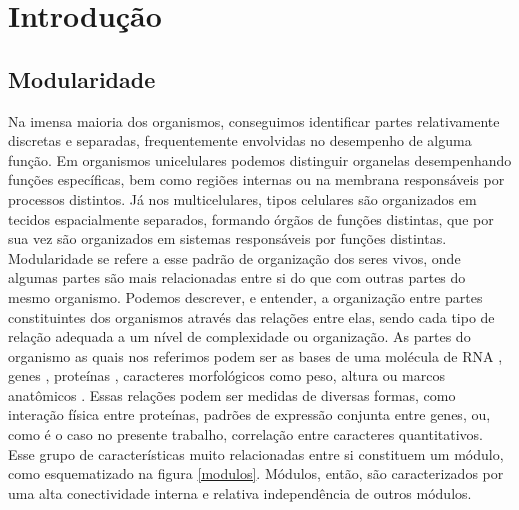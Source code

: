 \cleardoublepage
\pagestyle{fancy}

\chapter{Introdução}\label{intro}

\section{Modularidade}\label{intro:modularidade}

Na imensa maioria dos organismos, conseguimos identificar partes relativamente discretas
e separadas, frequentemente envolvidas no desempenho de alguma função.
Em organismos unicelulares podemos distinguir organelas desempenhando
funções específicas, bem como regiões internas ou na membrana responsáveis por
processos distintos.
Já nos multicelulares, tipos celulares são organizados em tecidos espacialmente
separados, formando órgãos de funções distintas, que por sua vez são
organizados em sistemas responsáveis por funções distintas.
Modularidade se refere a esse padrão de organização dos seres vivos, onde
algumas partes são mais relacionadas entre si do que com outras partes
do mesmo organismo.
Podemos descrever, e entender, a organização entre partes
constituintes dos organismos através das relações entre elas, sendo cada
tipo de relação adequada a um nível de complexidade ou organização.
As partes do organismo as quais nos referimos podem ser as bases de uma
molécula de RNA \citep{Ancel2000}, genes \citep{Costanzo2010}, proteínas \citep{Han2004},
caracteres morfológicos como peso, altura ou marcos anatômicos
\citep{Klingenberg2008, Porto2009, Marroig2009}.
Essas relações podem ser medidas de diversas formas, como interação física
entre proteínas, padrões de expressão conjunta entre genes, ou, como é o caso
no presente trabalho, correlação entre caracteres quantitativos. 
Esse grupo de características muito relacionadas entre si constituem um
módulo, como esquematizado na figura \ref{modulos}. 
Módulos, então, são caracterizados por uma alta conectividade interna e
relativa independência de outros módulos.

